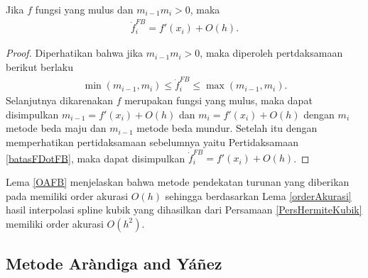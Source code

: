 \begin{lemma}\label{OAFB}
    Jika $f$ fungsi yang mulus dan $m_{i-1}m_i > 0$, maka
    \begin{gather*}
        \dot{f}_i^{FB}=f'(x_i) + O(h).
    \end{gather*}
\end{lemma}

\begin{proof}
    Diperhatikan bahwa jika $m_{i-1}m_i>0$, maka diperoleh pertdaksamaan berikut berlaku
    \begin{gather}\label{batasFDotFB}
        \min(m_{i-1},m_i) \leq \dot{f}_i^{FB}
        \leq \max(m_{i-1},m_i).
    \end{gather}
    Selanjutnya dikarenakan $f$ merupakan fungsi yang mulus, maka dapat disimpulkan $m_{i-1} = f'(x_i) + O(h)$ dan $m_{i} = f'(x_i) + O(h)$ dengan $m_i$ metode beda maju dan $m_{i-1}$ metode beda mundur. Setelah itu dengan memperhatikan pertidaksamaan sebelumnya yaitu Pertidaksamaan \eqref{batasFDotFB}, maka dapat disimpulkan $\dot{f}_i^{FB}=f'(x_i) + O(h)$.
\end{proof}

Lema \ref{OAFB} menjelaskan bahwa metode pendekatan turunan yang diberikan pada \cite{fritschMN} memiliki order akurasi $O(h)$ sehingga berdasarkan Lema \ref{orderAkurasi} hasil interpolasi spline kubik yang dihasilkan dari Persamaan \eqref{PersHermiteKubik} memiliki order akurasi $O(h^2)$.

\subsection{Metode Aràndiga and Yáñez}

